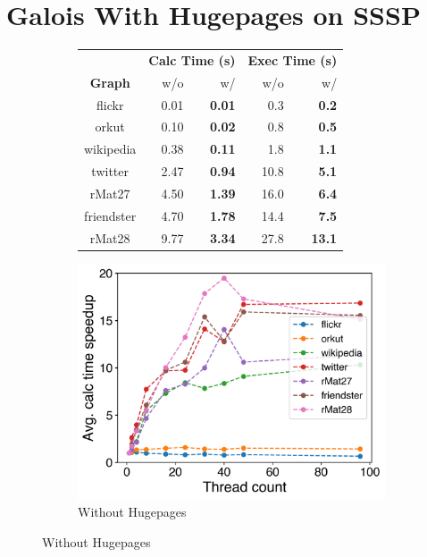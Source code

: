 \documentclass{meetings}
\begin{document}
\section{Galois With Hugepages on SSSP}
\begin{figure}[h!]
\hfil
\begin{subfigure}{0.33\linewidth}
	\sffamily
	\small
	\centering
	\begin{tabular}{cr@{\tabskip 2 \tabcolsep}rr@{\tabskip 2 \tabcolsep}r}
		&\multicolumn{2}{c}{\bf Calc Time (s)}&\multicolumn{2}{c}{\bf Exec Time (s)}\\
		\cmidrule{2-3}\cmidrule{4-5}
		\bf Graph&w/o&w/&w/o&w/\\
		\midrule
		flickr & 0.01 & \bf 0.01 & 0.3 & \bf 0.2\\
		orkut & 0.10 & \bf 0.02 & 0.8 & \bf 0.5\\
		wikipedia & 0.38 & \bf 0.11 & 1.8 & \bf 1.1\\
		twitter & 2.47 & \bf 0.94 & 10.8 & \bf 5.1\\
		rMat27 & 4.50 & \bf 1.39 & 16.0 & \bf 6.4\\
		friendster & 4.70 & \bf 1.78 & 14.4 & \bf 7.5\\
		rMat28 & 9.77 & \bf 3.34 & 27.8 & \bf 13.1\\
\end{tabular}
\end{subfigure}
\hfil
\begin{subfigure}{0.3\linewidth}
\centering
\includegraphics[width=\linewidth]{../../plots/singleNodeSSSPGaloisThreads.png}
	\caption{Without Hugepages}
\end{subfigure}

\end{figure}
\end{document}
